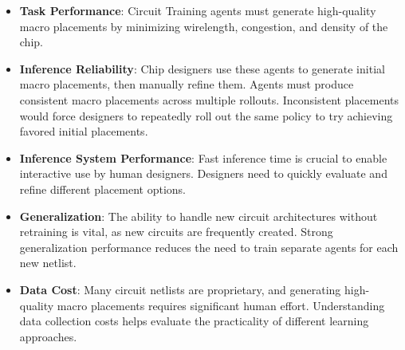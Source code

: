 \begin{itemize}
    \item \textbf{Task Performance}: Circuit Training agents must generate high-quality macro placements by minimizing wirelength, congestion, and density of the chip.
    
    \item \textbf{Inference Reliability}: Chip designers use these agents to generate initial macro placements, then manually refine them. Agents must produce consistent macro placements across multiple rollouts. Inconsistent placements would force designers to repeatedly roll out the same policy to try achieving favored initial placements.
    
    \item \textbf{Inference System Performance}: Fast inference time is crucial to enable interactive use by human designers. Designers need to quickly evaluate and refine different placement options.
    
    \item \textbf{Generalization}: The ability to handle new circuit architectures without retraining is vital, as new circuits are frequently created. Strong generalization performance reduces the need to train separate agents for each new netlist.
    
    \item \textbf{Data Cost}: Many circuit netlists are proprietary, and generating high-quality macro placements requires significant human effort. Understanding data collection costs helps evaluate the practicality of different learning approaches.
\end{itemize}


